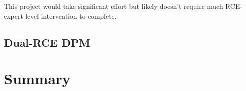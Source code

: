  This project would take significant effort but likely doesn't require much RCE-expert level intervention to complete.  

\subsection{Dual-RCE DPM}
\label{sec:dualRCE}



\section{Summary}






